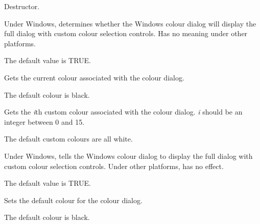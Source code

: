 

Destructor.

\label{wxcolourdatagetchoosefull}


Under Windows, determines whether the Windows colour dialog will display the full dialog
with custom colour selection controls. Has no meaning under other platforms.

The default value is TRUE.

\label{wxcolourdatagetcolour}


Gets the current colour associated with the colour dialog.

The default colour is black.

\label{wxcolourdatagetcustomcolour}


Gets the {\it i}th custom colour associated with the colour dialog. {\it i} should
be an integer between 0 and 15.

The default custom colours are all white.

\label{wxcolourdatasetchoosefull}


Under Windows, tells the Windows colour dialog to display the full dialog
with custom colour selection controls. Under other platforms, has no effect.

The default value is TRUE.

\label{wxcolourdatasetcolour}


Sets the default colour for the colour dialog.

The default colour is black.

\label{wxcolourdatasetcustomcolour}


